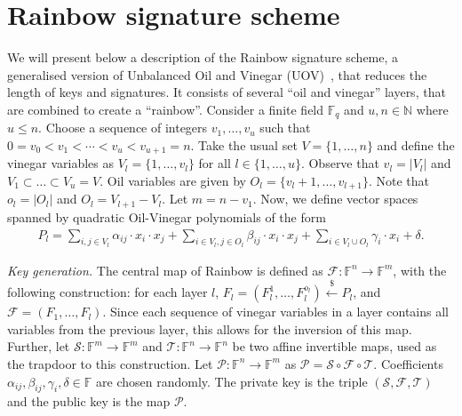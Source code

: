 \documentclass[openright]{report}
\newcommand{\random}{\stackrel{\$}{\longleftarrow}}
\begin{document}

\section{Rainbow signature scheme}\label{sec:scheme}

We will present below a description of the Rainbow signature scheme, a
generalised version of Unbalanced Oil and Vinegar
(UOV)~\cite{Kipnis:199904:inproc}, that reduces the length of keys and
signatures. It consists of several ``oil and vinegar'' layers, that are
combined to create a ``rainbow''. Consider a finite field $\mathbb{F}_{q}$ and
$u, n \in \mathbb{N}$ where $u \leq n$. Choose a sequence of integers
$v_{1}, \dots, v_{u}$ such that
$0 = v_{0} < v_{1} < \cdots < v_{u} < v_{u + 1} = n$. Take the usual set
$V = \{1, \dots, n\}$ and define the vinegar variables as
$V_{l} = \{1, \dots, v_{l}\}$ for all $l \in \{1, \dots, u\}$. Observe that
$v_{l} = |V_{l}|$ and $V_{1} \subset \dots \subset V_{u} = V$. Oil variables
are given by $O_{l} = \{v_{l} + 1, \dots, v_{l + 1}\}$. Note that
$o_{l} = |O_{l}|$ and $O_{l} = V_{l + 1} - V_{l}$. Let $m = n - v_{1}$. Now,
we define vector spaces spanned by quadratic Oil-Vinegar polynomials of the
form
\begin{align}
  P_{l} = \sum_{i, j \in V_{l}} \alpha_{ij} \cdot x_{i} \cdot x_{j}
    + \sum_{i \in V_{l}, j \in O_{l}} \beta_{ij} \cdot x_{i} \cdot x_{j}
    + \sum_{i \in V_{l} \cup O_{l}} \gamma_{i} \cdot x_{i} + \delta.
\end{align}

\emph{Key generation.} The central map of Rainbow is defined as
$\mathcal{F} : \mathbb{F}^{n} \longrightarrow \mathbb{F}^{m}$, with the
following construction: for each layer $l$,
$F_{l} = (F_{l}^{1}, \dots, F_{l}^{o_{l}}) \random{} P_{l}$,
and $\mathcal{F} = (F_{1}, \dots, F_{l})$. Since each sequence of vinegar
variables in a layer contains all variables from the previous layer, this
allows for the inversion of this map. Further, let
$\mathcal{S} : \mathbb{F}^{m} \longrightarrow \mathbb{F}^{m}$ and
$\mathcal{T} : \mathbb{F}^{n} \longrightarrow \mathbb{F}^{n}$ be two affine
invertible maps, used as the trapdoor to this construction. Let
$\mathcal{P} : \mathbb{F}^{n} \longrightarrow \mathbb{F}^{m}$ as
$\mathcal{P} = \mathcal{S} \circ \mathcal{F} \circ \mathcal{T}$.
Coefficients $\alpha_{ij}, \beta_{ij}, \gamma_{i}, \delta \in \mathbb{F}$ are
chosen randomly. The private key is the triple
$(\mathcal{S}, \mathcal{F}, \mathcal{T})$ and the public key is the map
$\mathcal{P}$.
\end{document}
